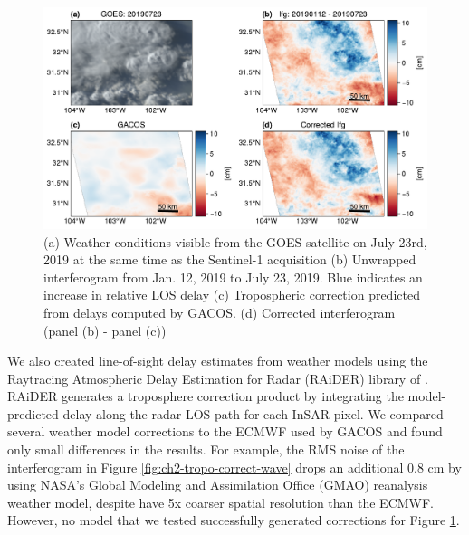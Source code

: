 \begin{figure}
	\centering
	\includegraphics[width=1.0\textwidth]{figures/chapter2-sar/figure_tropo_correct_gacos_storm.pdf}	
	\caption[West Texas tropospheric correction attempt for thunderstorm]{
		(a) Weather conditions visible from the GOES satellite on July 23rd, 2019 at the same time as the Sentinel-1 acquisition
		(b) Unwrapped interferogram from Jan. 12, 2019 to July 23, 2019. Blue indicates an increase in relative LOS delay
		(c) Tropospheric correction predicted from delays computed by GACOS.
		(d) Corrected interferogram (panel (b) - panel (c))
	}
	\label{fig:ch2-tropo-correct-storm}
\end{figure}



We also created line-of-sight delay estimates from weather models using the Raytracing Atmospheric Delay Estimation for Radar (RAiDER) library of \cite{Maurer2021RaiderRaytracingAtmospheric}. RAiDER generates a troposphere correction product by integrating the model-predicted delay along the radar LOS path for each InSAR pixel. We compared several weather model corrections to the ECMWF used by GACOS and found only small differences in the results. For example, the RMS noise of the interferogram in Figure \ref{fig:ch2-tropo-correct-wave} drops an additional 0.8 cm by using NASA's Global Modeling and Assimilation Office (GMAO) reanalysis weather model, despite have 5x coarser spatial resolution than the ECMWF. However, no model that we tested successfully generated corrections for Figure \ref{fig:ch2-tropo-correct-storm}.

